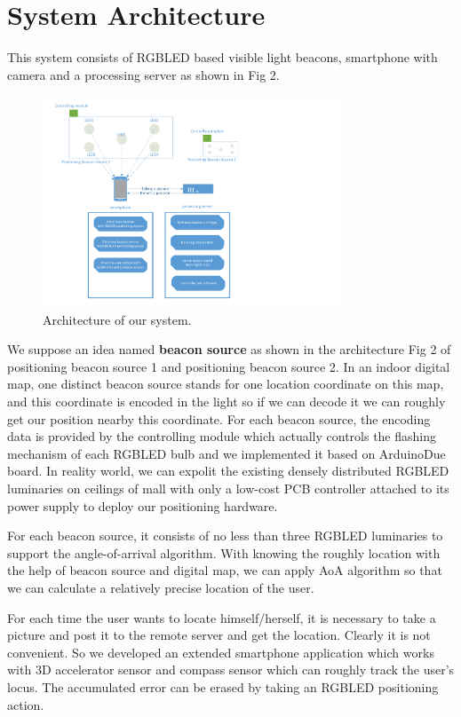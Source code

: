 \documentclass[conference]{IEEEtran}
\begin{document}
\section{\textbf{System Architectur}e}
This system consists of RGBLED based visible light beacons, smartphone with camera and a processing server as shown in Fig 2.
	
	\begin{figure}
		\centering
		\includegraphics[width=3.5in]{../img.origin/fig2.pdf}
		\caption{Architecture of our system.}
		\label{fig_2}
	\end{figure}

We suppose an idea named \textbf{beacon source} as shown in the architecture Fig 2 of positioning beacon source 1 and positioning beacon source 2. In an indoor digital map, one distinct beacon source stands for one location coordinate on this map, and this coordinate is encoded in the light so if we can decode it we can roughly get our position nearby this coordinate. For each beacon source, the encoding data is provided by the controlling module which actually controls the flashing mechanism of each RGBLED bulb and we implemented it based on ArduinoDue board. In reality world, we can expolit the existing densely distributed RGBLED luminaries on ceilings of mall with only a low-cost PCB controller attached to its power supply to deploy our positioning hardware.

For each beacon source, it consists of no less than three RGBLED luminaries to support the angle-of-arrival algorithm. With knowing the roughly location with the help of beacon source and digital map, we can apply AoA algorithm so that we can calculate a relatively precise location of the user. 

For each time the user wants to locate himself/herself, it is necessary to take a picture and post it to the remote server and get the location. Clearly it is not convenient. So we developed an extended smartphone application which works with 3D accelerator sensor and compass sensor which can roughly track the user's locus. The accumulated error can be erased by taking an RGBLED positioning action.
	
\end{document}
